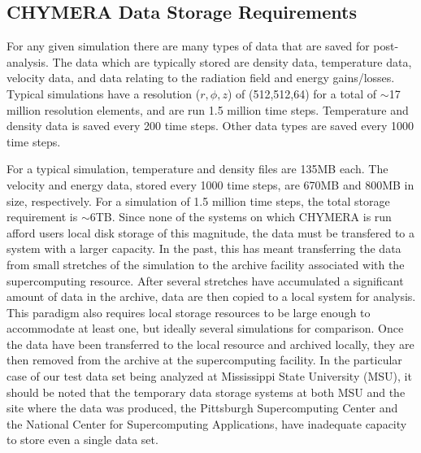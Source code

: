 \documentclass[]{sig-alternate}
\begin{document}
\subsection{CHYMERA Data Storage Requirements}
For any given simulation there are many types of data that are saved for post-analysis. The data which are typically stored are density data, temperature data, velocity data, and data relating to the radiation field and energy gains/losses. Typical simulations have a resolution ($r,\phi,z$) of (512,512,64) for a total of $\sim$17 million resolution elements, and are run 1.5 million time steps. Temperature and density data is saved every 200 time steps. Other data types are saved every 1000 time steps.  

For a typical simulation, temperature and density files are 135MB each. The velocity and energy data, stored every 1000 time steps, are 670MB and 800MB in size, respectively. For a simulation of 1.5 million time steps, the total storage requirement is $\sim$6TB. Since none of the systems on which CHYMERA is run afford users local disk storage of this magnitude, the data must be transfered to a system with a larger capacity. In the past, this has meant transferring the data from small stretches of the simulation to the archive facility associated with the supercomputing resource. After several stretches have accumulated a significant amount of data in the archive, data are then copied to a local system for analysis. This paradigm also requires local storage resources to be large enough to accommodate at least one, but ideally several simulations for comparison. Once the data have been transferred to the local resource and archived locally, they are then removed from the archive at the supercomputing facility. In the particular case of our test data set being analyzed at Mississippi State University (MSU), it should be noted that the temporary data storage systems at both MSU and the site where the data was produced, the Pittsburgh Supercomputing Center and the National Center for Supercomputing Applications, have inadequate capacity to store even a single data set. 
\end{document}
